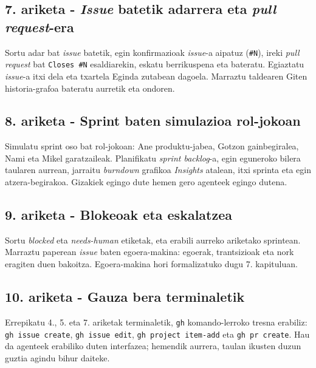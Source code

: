 
\subsection{7. ariketa - \textit{Issue} batetik adarrera eta \textit{pull request}-era}

Sortu adar bat \textit{issue} batetik, egin konfirmazioak \textit{issue}-a aipatuz (\verb|#N|), ireki \textit{pull request} bat \verb|Closes #N| esaldiarekin, eskatu berrikuspena eta bateratu.
Egiaztatu \textit{issue}-a itxi dela eta txartela Eginda zutabean dagoela.
Marraztu taldearen Giten historia-grafoa bateratu aurretik eta ondoren.


\subsection{8. ariketa - Sprint baten simulazioa rol-jokoan}

Simulatu sprint oso bat rol-jokoan: Ane produktu-jabea, Gotzon gainbegiralea, Nami eta Mikel garatzaileak.
Planifikatu \textit{sprint backlog}-a, egin eguneroko bilera taularen aurrean, jarraitu \textit{burndown} grafikoa \textit{Insights} atalean, itxi sprinta eta egin atzera-begirakoa.
Gizakiek egingo dute hemen gero agenteek egingo dutena.


\subsection{9. ariketa - Blokeoak eta eskalatzea}

Sortu \textit{blocked} eta \textit{needs-human} etiketak, eta erabili aurreko ariketako sprintean.
Marraztu paperean \textit{issue} baten egoera-makina: egoerak, trantsizioak eta nork eragiten duen bakoitza.
Egoera-makina hori formalizatuko dugu 7. kapituluan.


\subsection{10. ariketa - Gauza bera terminaletik}

Errepikatu 4., 5. eta 7. ariketak terminaletik, \verb|gh| komando-lerroko tresna erabiliz: \verb|gh issue create|, \verb|gh issue edit|, \verb|gh project item-add| eta \verb|gh pr create|.
Hau da agenteek erabiliko duten interfazea; hemendik aurrera, taulan ikusten duzun guztia agindu bihur daiteke.


